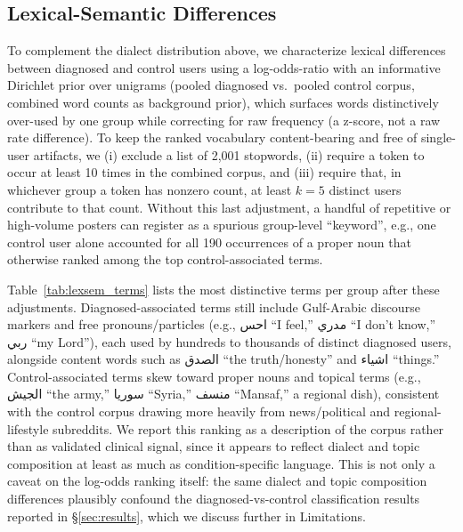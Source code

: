 \documentclass[letterpaper]{article} %
\begin{document}
\subsection{Lexical-Semantic Differences}
\label{subsec:lexsem}

To complement the dialect distribution above, we characterize lexical differences between diagnosed and control users using a log-odds-ratio with an informative Dirichlet prior \citep{monroe-etal-2008-fightin} over unigrams (pooled diagnosed vs.\ pooled control corpus, combined word counts as background prior), which surfaces words distinctively over-used by one group while correcting for raw frequency (a z-score, not a raw rate difference).
To keep the ranked vocabulary content-bearing and free of single-user artifacts,
we (i) exclude a list of 2,001 stopwords, (ii) require a token to occur at least 10 times in the combined corpus, and
(iii) require that, in whichever group a token has nonzero count, at least $k{=}5$ distinct users contribute to that count.
Without this last adjustment, a handful of repetitive or high-volume posters can register as a spurious group-level
``keyword'', e.g., one control user alone accounted for all 190 occurrences of a proper noun that otherwise ranked
among the top control-associated terms.

Table~\ref{tab:lexsem_terms} lists the most distinctive terms per group after these adjustments. Diagnosed-associated terms still include Gulf-Arabic discourse markers and free pronouns/particles (e.g., \foreignlanguage{arabic}{احس} ``I feel,'' \foreignlanguage{arabic}{مدري} ``I don't know,'' \foreignlanguage{arabic}{ربي} ``my Lord''), each used by hundreds to thousands of distinct diagnosed users, alongside content words such as \foreignlanguage{arabic}{الصدق} ``the truth/honesty'' and \foreignlanguage{arabic}{اشياء} ``things.'' Control-associated terms skew toward proper nouns and topical terms (e.g., \foreignlanguage{arabic}{الجيش} ``the army,'' \foreignlanguage{arabic}{سوريا} ``Syria,'' \foreignlanguage{arabic}{منسف} ``Mansaf,'' a regional dish), consistent with the control corpus drawing more heavily from news/political and regional-lifestyle subreddits. We report this ranking as a description of the corpus rather than as validated clinical signal, since it appears to reflect dialect and topic composition at least as much as condition-specific language. This is not only a caveat on the log-odds ranking itself: the same dialect and topic composition differences plausibly confound the diagnosed-vs-control classification results reported in §\ref{sec:results}, which we discuss further in Limitations.
\end{document}
